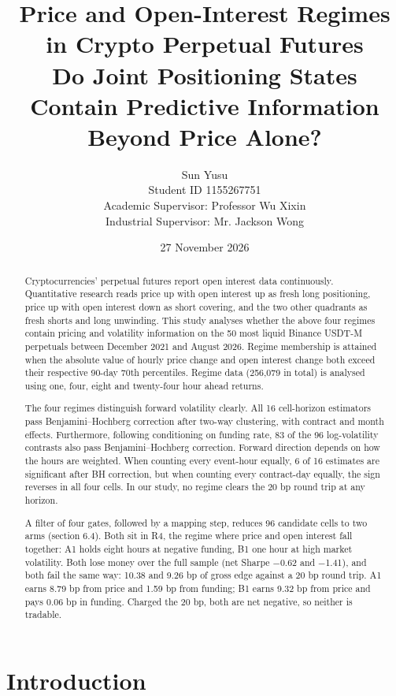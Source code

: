 \documentclass[11pt,a4paper]{article}
\title{\textbf{Price and Open-Interest Regimes in Crypto Perpetual Futures}\\[4pt]
\large Do Joint Positioning States Contain Predictive Information Beyond Price Alone?}
\author{Sun Yusu\\[2pt]\small Student ID 1155267751\\[6pt]
\small Academic Supervisor: Professor Wu Xixin\\
\small Industrial Supervisor: Mr. Jackson Wong}
\date{27 November 2026}
\begin{document}
\maketitle

\bigskip

\begin{abstract}
Cryptocurrencies’ perpetual futures report open interest data continuously. Quantitative research reads price up with open interest up as fresh long positioning, price up with open interest down as short covering, and the two other quadrants as fresh shorts and long unwinding. This study analyses whether the above four regimes contain pricing and volatility information on the 50 most liquid Binance USDT-M perpetuals between December 2021 and August 2026. Regime membership is attained when the absolute value of hourly price change and open interest change both exceed their respective 90-day 70th percentiles. Regime data (256,079 in total) is analysed using one, four, eight and twenty-four hour ahead returns.

The four regimes distinguish forward volatility clearly. All 16 cell-horizon estimators pass Benjamini--Hochberg correction after two-way clustering, with contract and month effects. Furthermore, following conditioning on funding rate, 83 of the 96 log-volatility contrasts also pass Benjamini--Hochberg correction. Forward direction depends on how the hours are weighted. When counting every event-hour equally, 6 of 16 estimates are significant after BH correction, but when counting every contract-day equally, the sign reverses in all four cells. In our study, no regime clears the 20 bp round trip at any horizon.

A filter of four gates, followed by a mapping step, reduces 96 candidate cells to two arms (section 6.4). Both sit in R4, the regime where price and open interest fall together: A1 holds eight hours at negative funding, B1 one hour at high market volatility. Both lose money over the full sample (net Sharpe $-$0.62 and $-$1.41), and both fail the same way: 10.38 and 9.26 bp of gross edge against a 20 bp round trip. A1 earns 8.79 bp from price and 1.59 bp from funding; B1 earns 9.32 bp from price and pays 0.06 bp in funding. Charged the 20 bp, both are net negative, so neither is tradable.

\end{abstract}
\newpage
\tableofcontents
\newpage
\section{Introduction}
\end{document}
